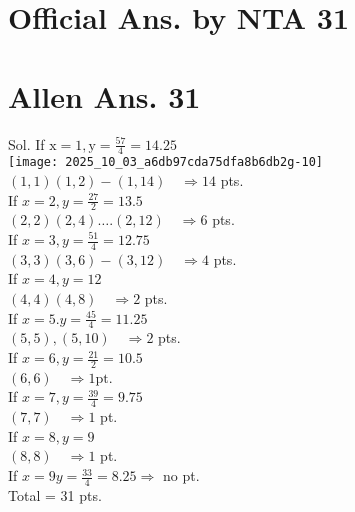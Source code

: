 \documentclass[10pt]{article}
\begin{document}
\section*{Official Ans. by NTA 31}
\section*{Allen Ans. 31}
Sol. If \(\mathrm{x}=1, \mathrm{y}=\frac{57}{4}=14.25\)\\
\texttt{[image: 2025\_10\_03\_a6db97cda75dfa8b6db2g-10]}\\
\((1,1)(1,2)-(1,14) \quad \Rightarrow 14\) pts.\\
If \(x=2, y=\frac{27}{2}=13.5\)\\
\((2,2)(2,4) \ldots .(2,12) \quad \Rightarrow 6\) pts.\\
If \(x=3, y=\frac{51}{4}=12.75\)\\
\((3,3)(3,6)-(3,12) \quad \Rightarrow 4\) pts.\\
If \(x=4, y=12\)\\
\((4,4)(4,8) \quad \Rightarrow 2\) pts.\\
If \(x=5 . y=\frac{45}{4}=11.25\)\\
\((5,5),(5,10) \quad \Rightarrow 2\) pts.\\
If \(x=6, y=\frac{21}{2}=10.5\)\\
\((6,6) \quad \Rightarrow 1 \mathrm{pt}\).\\
If \(x=7, y=\frac{39}{4}=9.75\)\\
\((7,7) \quad \Rightarrow 1\) pt.\\
If \(x=8, y=9\)\\
\((8,8) \quad \Rightarrow 1\) pt.\\
If \(x=9 y=\frac{33}{4}=8.25 \Rightarrow\) no pt.\\
Total = 31 pts.
\end{document}
